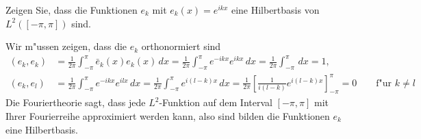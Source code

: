 Zeigen Sie, dass die Funktionen $e_k$ mit
$e_k(x)=e^{ikx}$ eine Hilbertbasis von $L^2([-\pi,\pi])$
sind.

\begin{loesung}
Wir m"ussen zeigen, dass die $e_k$ orthonormiert sind
\begin{align*}
(e_k,e_k)
&=
\frac1{2\pi}\int_{-\pi}^{\pi}\bar e_k(x)e_k(x)\,dx
=
\frac1{2\pi}\int_{-\pi}^{\pi}
e^{-ikx}e^{ikx}
\,dx
=
\frac1{2\pi}\int_{-\pi}^{\pi}\,dx=1,
\\
(e_k,e_l)
&=
\frac1{2\pi}\int_{-\pi}^{\pi} e^{-ikx}e^{ilx}\,dx
=
\frac1{2\pi}\int_{-\pi}^{\pi} e^{i(l-k)x}\,dx
=
\frac1{2\pi}\left[
\frac1{i(l-k)}e^{i(l-k)x}
\right]_{-\pi}^{\pi}
=0\qquad \text{f"ur $k\ne l$}
\end{align*}
Die Fouriertheorie sagt, dass jede $L^2$-Funktion auf dem Interval
$[-\pi,\pi]$ mit Ihrer Fourierreihe approximiert werden kann, also
sind bilden die Funktionen $e_k$ eine Hilbertbasis.
\end{loesung}


